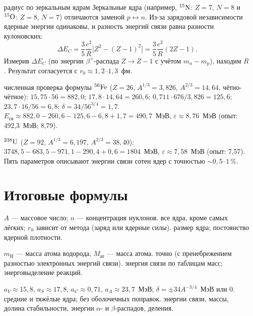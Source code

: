 \begin{derivation}[label=der:17:mirror]{радиус по зеркальным ядрам}
Зеркальные ядра (например, $\nucl{N}{15}$: $Z=7$, $N=8$ и $\nucl{O}{15}$: $Z=8$, $N=7$) отличаются заменой $p\leftrightarrow n$. Из-за
зарядовой независимости ядерные энергии одинаковы, и разность энергий связи равна разности кулоновских:
\[
  \Delta E_C=\frac35\frac{e^2}{R}\bigl[Z^2-(Z-1)^2\bigr]=\frac35\frac{e^2}{R}(2Z-1).
\]
Измерив $\Delta E_C$ (по энергии $\beta^+$-распада $Z\to Z-1$ с учётом $m_n-m_p$), находим $R$. Результат согласуется с $r_0\approx1{,}2$--$1{,}3$~фм.
\end{derivation}

\begin{derivation}[label=der:17:check]{численная проверка формулы}
\emph{$\nucl{Fe}{56}$} ($Z=26$, $A^{1/3}=3{,}826$, $A^{2/3}=14{,}64$, чётно-чётное):
$15{,}75\cdot56=882{,}0$; $17{,}8\cdot14{,}64=260{,}6$; $0{,}711\cdot676/3{,}826=125{,}6$; $23{,}7\cdot16/56=6{,}8$; $\delta=34/56^{3/4}=1{,}7$.
$E_{\text{св}}\approx882{,}0-260{,}6-125{,}6-6{,}8+1{,}7=490{,}7$~МэВ, $\varepsilon\approx8{,}76$~МэВ (опыт: 492,3~МэВ; 8,79).

\emph{$\nucl{U}{238}$} ($Z=92$, $A^{1/3}=6{,}197$, $A^{2/3}=38{,}40$): $3748{,}5-683{,}5-971{,}1-290{,}4+0{,}6=1804$~МэВ, $\varepsilon\approx7{,}58$~МэВ
(опыт: 7,57). Пять параметров описывают энергии связи сотен ядер с точностью $\sim0{,}5$--$1\,\%$.
\end{derivation}

\section{Итоговые формулы}

 {$A$ — массовое число; $n$ — концентрация нуклонов.}
 {все ядра, кроме самых лёгких; $r_0$ зависит от метода (заряд или ядерные силы).}
 {размер ядра; постоянство ядерной плотности.}

 {$m_{\mathrm H}$ — масса атома водорода, $M_{\text{ат}}$ — масса атома.}
 {точно (с пренебрежением разностью электронных энергий связи).}
 {энергия связи по таблицам масс; энерговыделение реакций.}

 {$a_V\approx15{,}8$, $a_S\approx17{,}8$, $a_C\approx0{,}71$, $a_A\approx23{,}7$~МэВ; $\delta=\pm34A^{-3/4}$~МэВ или 0.}
 {средние и тяжёлые ядра; без оболочечных поправок.}
 {энергии связи, массы, долина стабильности, энергии $\alpha$- и $\beta$-распадов, деления.}

